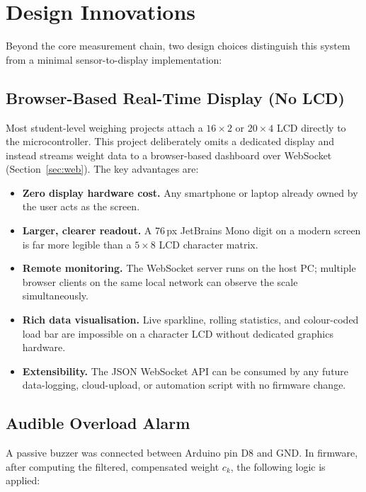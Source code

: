 \documentclass[12pt,a4paper]{article}
\begin{document}
\section{Design Innovations}

Beyond the core measurement chain, two design choices distinguish this system from a
minimal sensor-to-display implementation:

\subsection{Browser-Based Real-Time Display (No LCD)}

Most student-level weighing projects attach a $16\times2$ or $20\times4$ LCD directly
to the microcontroller. This project deliberately omits a dedicated display and instead
streams weight data to a browser-based dashboard over WebSocket (Section~\ref{sec:web}).
The key advantages are:

\begin{itemize}
  \item \textbf{Zero display hardware cost.} Any smartphone or laptop already owned by
        the user acts as the screen.
  \item \textbf{Larger, clearer readout.} A 76\,px JetBrains Mono digit on a modern
        screen is far more legible than a $5\times8$ LCD character matrix.
  \item \textbf{Remote monitoring.} The WebSocket server runs on the host PC; multiple
        browser clients on the same local network can observe the scale simultaneously.
  \item \textbf{Rich data visualisation.} Live sparkline, rolling statistics, and
        colour-coded load bar are impossible on a character LCD without dedicated
        graphics hardware.
  \item \textbf{Extensibility.} The JSON WebSocket API can be consumed by any future
        data-logging, cloud-upload, or automation script with no firmware change.
\end{itemize}

\subsection{Audible Overload Alarm}

A passive buzzer was connected between Arduino pin D8 and GND. In firmware, after
computing the filtered, compensated weight $c_k$, the following logic is applied:
\end{document}
